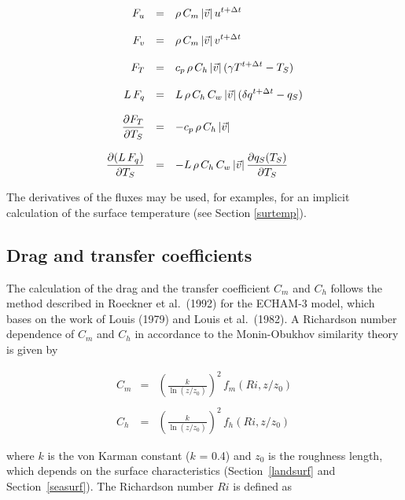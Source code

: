 \begin{equation}\label{fluxes2}
\begin{array}{rcl}
\displaystyle F_u   & = & \displaystyle \rho \, C_m \, |\vec{v}| \,
u^{t+\Delta t} \\
&& \\
\displaystyle F_v   & = & \displaystyle \rho \, C_m \, |\vec{v}| \, v^{t+
\Delta t}\\
&& \\
\displaystyle F_T   & = & \displaystyle c_p \, \rho \, C_h \, |\vec{v}|  \,
(\gamma
T^{t + \Delta t}
- T_S )  \\
&& \\
\displaystyle L \, F_q & = & \displaystyle L\, \rho \, C_h \, C_w \, |\vec{v}|
\, 
(\delta
q^{t+\Delta t} -  q_S ) \\
&& \\
\displaystyle \frac{\partial F_T}{\partial T_S}  & = & \displaystyle - c_p \,
\rho \, C_h \, |\vec{v}|  \\
&& \\
\displaystyle \frac{\partial (L \, F_q)}{\partial T_S} & = & \displaystyle -
L\, \rho \, C_h \, C_w \, |\vec{v}| \, 
\frac{\partial  q_S(T_S)}{\partial T_S}
\end{array}
\end{equation}

The derivatives of the fluxes may be used, for
examples, for an implicit calculation of the
surface temperature (see Section \ref{surtemp}). 

\subsection*{ Drag and transfer coefficients}

The calculation of  the drag and the transfer 
coefficient $C_m$ and $C_h$ follows the method 
described  in Roeckner et al.~(1992) for the ECHAM-3
model,  which bases on the work of Louis (1979) and
Louis et al.~(1982).  A Richardson number dependence
of 
$C_m$ and $C_h$  in accordance to the
Monin-Obukhov
similarity theory is given by

\begin{equation}
\begin{array}{rcl}
C_m & = & \left( \frac{k}{\ln (z/z_0)}\right)^{2} \,
f_m
(Ri, z/z_0) \\
&&\\
C_h & = & \left( \frac{k}{\ln (z/z_0)}\right)^{2} \, f_h
(Ri, z/z_0) 
\end{array}
\end{equation}

where $k$ is the von Karman constant  ($k$ = 0.4) and
$z_0$ is the roughness length, which depends on the
surface characteristics (Section~\ref{landsurf} and
Section~\ref{seasurf}). The Richardson
number $Ri$ is
defined as

